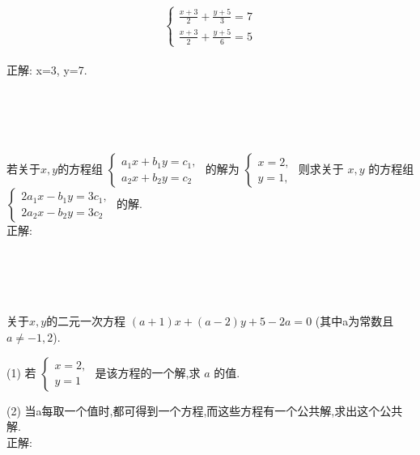 \item {
    \[\left\{
        \begin{array}{l}
            \frac{x+3}{2} + \frac{y+5}{3} = 7 \\
            \frac{x+3}{2} + \frac{y+5}{6} = 5
        \end{array}
    \right.\]
    \ifshowSolution
        \fangsong{}
        \\
        正解: x=3, y=7.
    \else
        \\ \\ \\ \\ \\
    \fi
}

\item {
    若关于$x, y$的方程组
    $\begin{cases}
        a_1x + b_1y = c_1, \\ 
        a_2x + b_2y = c_2  
    \end{cases}$
    的解为
    $\begin{cases}
        x = 2, \\ 
        y = 1,  
    \end{cases}$
    则求关于 $x, y$ 的方程组
    $\begin{cases}
        2a_1x - b_1y = 3c_1, \\ 
        2a_2x - b_2y = 3c_2
    \end{cases}$
    的解.
    \ifshowSolution
        \fangsong{}
        \\
        正解:
    \else
        \\ \\ \\ \\ \\
    \fi
}

\item {
    关于$x, y$的二元一次方程
    $(a+1)x + (a-2)y + 5 - 2a = 0$
    (其中a为常数且$a\neq -1, 2$).

    (1) 若
    $\begin{cases}
        x = 2, \\ 
        y = 1
    \end{cases}$
    是该方程的一个解,求 $a$ 的值.

    (2) 当a每取一个值时,都可得到一个方程,而这些方程有一个公共解,求出这个公共解.
    \ifshowSolution
        \fangsong{}
        \\
        正解:
    \else
        \\ \\ \\ \\ \\
    \fi
}

